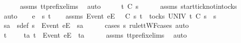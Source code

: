 \ \ \ \ \isamarkupfalse%
\ assms{\isacharparenleft}{}{\isacharparenright}\ tt{\isacharunderscore}prefix{\isachardot}elims{\isacharparenleft}{}{\isacharparenright}\ \isamarkupfalse%
\ auto\isanewline
\ \ \isamarkupfalse%
\ \isamarkupfalse%
\ {\isachardoublequoteopen}t\ {\isasymle}\isactrlsub C\ s{}{\isacharprime}{\isachardoublequoteclose}\isanewline
\ \ \ \ \isamarkupfalse%
\ assms{\isacharparenleft}{}{\isacharparenright}\ start{\isacharunderscore}tick{\isacharunderscore}notin{\isacharunderscore}tocks\ \isamarkupfalse%
\ auto\isanewline
{}\isamarkupfalse%
\isanewline
\ \ \isamarkupfalse%
\ e\ {\isasymsigma}\ s{}{\isacharprime}\ t\isanewline
\ \ \isamarkupfalse%
\ assms{\isacharcolon}\ {\isachardoublequoteopen}{\isacharbrackleft}Event\ e{\isacharbrackright}\isactrlsub E\ {\isacharhash}\ {\isasymsigma}\ {\isasymsubseteq}\isactrlsub C\ s{}{\isacharprime}{\isachardoublequoteclose}\ {\isachardoublequoteopen}t\ {\isasymin}\ tocks\ UNIV{\isachardoublequoteclose}\ {\isachardoublequoteopen}t\ {\isasymle}\isactrlsub C\ s{}{\isacharprime}\ {\isacharat}\ s{}{\isachardoublequoteclose}\isanewline
\ \ \isamarkupfalse%
\ \isamarkupfalse%
\ s{}{\isacharprime}a\ \ s{}{\isacharprime}{\isacharunderscore}def{\isacharcolon}\ {\isachardoublequoteopen}s{}{\isacharprime}\ {\isacharequal}\ {\isacharbrackleft}Event\ e{\isacharbrackright}\isactrlsub E\ {\isacharhash}\ s{}{\isacharprime}a{\isachardoublequoteclose}\isanewline
\ \ \ \ \isamarkupfalse%
\ {\isacharparenleft}cases\ s{}{\isacharprime}\ rule{\isacharcolon}ttWF{\isachardot}cases{\isacharcomma}\ auto{\isacharparenright}\isanewline
\ \ \isamarkupfalse%
\ \isamarkupfalse%
\ {\isachardoublequoteopen}t\ {\isacharequal}\ {\isacharbrackleft}{\isacharbrackright}\ {\isasymor}\ {\isacharparenleft}{\isasymexists}\ ta{\isachardot}\ t\ {\isacharequal}\ {\isacharbrackleft}Event\ e{\isacharbrackright}\isactrlsub E\ {\isacharhash}\ ta{\isacharparenright}{\isachardoublequoteclose}\isanewline
\ \ \ \ \isamarkupfalse%
\ assms{\isacharparenleft}{}{\isacharparenright}\ tt{\isacharunderscore}prefix{\isachardot}elims{\isacharparenleft}{}{\isacharparenright}\ \isamarkupfalse%
\ auto\isanewline
